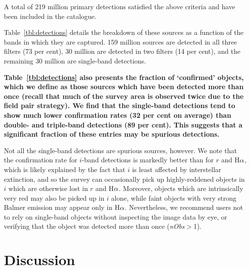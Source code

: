\documentclass[a4paper,useAMS,usenatbib]{mn2e}
\def\ha{\mbox{H$\rm \alpha$}}
\begin{document}
A total of 219 million primary detections satisfied
the above criteria and have been included in the catalogue.

Table~\ref{tbl:detections} details the breakdown of these
sources as a function of the bands in which they are captured.
159 million sources are detected in all three filters (73 per cent),
30 million are detected in two filters (14 per cent),
and the remaining 30 million are single-band detections.
{\bf
Table~\ref{tbl:detections} also presents 
the fraction of `confirmed' objects,
which we define as those sources
which have been detected more than once
(recall that much of the survey area
is observed twice due to the field pair strategy).
We find that the single-band detections tend
to show much lower confirmation rates (32 per cent on average)
than double- and triple-band detections (89 per cent).
This suggests that a significant fraction of
these entries may be spurious detections.

Not all the single-band detections are spurious sources, however.
We note that the confirmation rate for $i$-band detections
is markedly better than for $r$ and \ha,
which is likely explained by the fact that $i$ is least
affected by interstellar extinction, and so the survey can occasionally pick up
highly-reddened objects in $i$ which are otherwise lost in $r$ and \ha.
Moreover, objects which are intrinsically very red may also be picked
up in $i$ alone, while faint objects with very strong Balmer emission
may appear only in \ha.
Nevertheless, we recommend users not to rely on single-band objects
without inspecting the image data by eye,
or verifying that the object
was detected more than once (\emph{nObs}$>$1).
}

\section{Discussion}
\label{sec:discussion}
\end{document}
